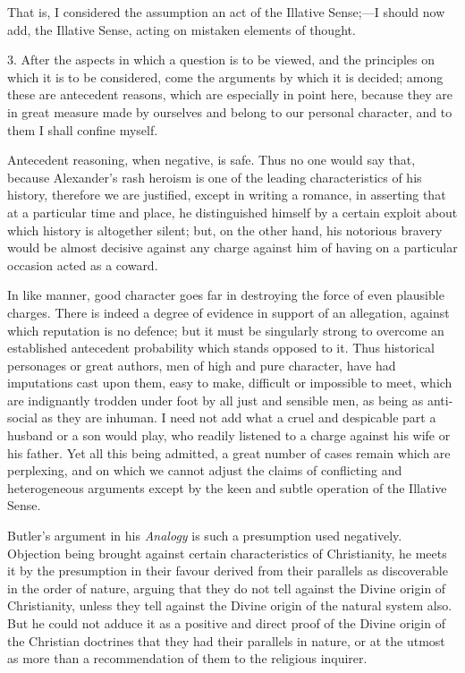 That is, I considered the assumption an act of the Illative
Sense;—I should now add, the Illative Sense, acting on mistaken
elements of thought.

3. After the aspects in which a question is to be viewed, and the
principles on which it is to be considered, come the arguments by
which it is decided; among these are antecedent reasons, which are
especially in point here, because they are in great measure made by
ourselves and belong to our personal character, and to them I shall
confine myself.

Antecedent reasoning, when negative, is safe. Thus no one would say
that, because Alexander's rash heroism is one of the leading
characteristics of his history, therefore we are justified, except in
writing a romance, in asserting that at a particular time and place,
he distinguished himself by a certain exploit about which history is
altogether silent; but, on the other hand, his notorious bravery would
be almost decisive against any charge against him of having on a
particular occasion acted as a coward.

In like manner, good character goes far in destroying the force of
even plausible charges. There is indeed a degree of evidence in
support of an allegation, against which reputation is no defence; but
it must be singularly strong to overcome an established antecedent
probability which stands opposed to it. Thus historical personages or
great authors, men of high and pure character, have had imputations
cast upon them, easy to make, difficult or impossible to meet, which
are indignantly trodden under foot by all just and sensible men, as
being as anti-social as they are inhuman. I need not add what a cruel
and despicable part a husband or a son would play, who readily listened to a charge against his wife or his father. Yet all this
being admitted, a great number of cases remain which are perplexing,
and on which we cannot adjust the claims of conflicting and
heterogeneous arguments except by the keen and subtle operation of the
Illative Sense.

Butler's argument in his \emph{Analogy} is such a presumption used
negatively. Objection being brought against certain characteristics of
Christianity, he meets it by the presumption in their favour derived
from their parallels as discoverable in the order of nature, arguing
that they do not tell against the Divine origin of Christianity,
unless they tell against the Divine origin of the natural system also.
But he could not adduce it as a positive and direct proof of the
Divine origin of the Christian doctrines that they had their parallels
in nature, or at the utmost as more than a recommendation of them to
the religious inquirer.

